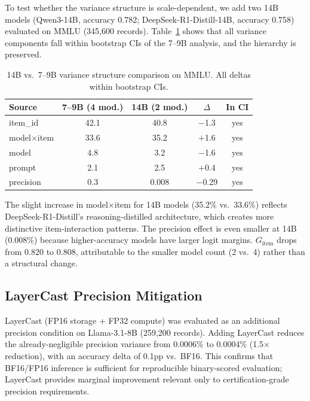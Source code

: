 \documentclass[11pt,a4paper]{article}
\newcommand{\Gcoeff}{\ensuremath{G}}
\begin{document}
To test whether the variance structure is scale-dependent, we add two 14B models (Qwen3-14B, accuracy 0.782; DeepSeek-R1-Distill-14B, accuracy 0.758) evaluated on MMLU (345,600 records).
Table~\ref{tab:scale} shows that all variance components fall within bootstrap CIs of the 7--9B analysis, and the hierarchy is preserved.

\begin{table}[t]
\centering
\caption{14B vs.\ 7--9B variance structure comparison on MMLU. All deltas within bootstrap CIs.}
\label{tab:scale}
\small
\begin{tabular}{lcccc}
\toprule
\textbf{Source} & \textbf{7--9B (4 mod.)} & \textbf{14B (2 mod.)} & \textbf{$\Delta$} & \textbf{In CI} \\
\midrule
item\_id        & 42.1 & 40.8 & $-$1.3 & yes \\
model$\times$item & 33.6 & 35.2 & $+$1.6 & yes \\
model           &  4.8 &  3.2 & $-$1.6 & yes \\
prompt          &  2.1 &  2.5 & $+$0.4 & yes \\
precision       &  0.3 & 0.008 & $-$0.29 & yes \\
\bottomrule
\end{tabular}
\end{table}

The slight increase in model$\times$item for 14B models (35.2\% vs.\ 33.6\%) reflects DeepSeek-R1-Distill's reasoning-distilled architecture, which creates more distinctive item-interaction patterns.
The precision effect is even smaller at 14B (0.008\%) because higher-accuracy models have larger logit margins.
$\Gcoeff_\text{item}$ drops from 0.820 to 0.808, attributable to the smaller model count (2 vs.\ 4) rather than a structural change.

\subsection{LayerCast Precision Mitigation}
\label{sec:layercast}

LayerCast (FP16 storage + FP32 compute) was evaluated as an additional precision condition on Llama-3.1-8B (259,200 records).
Adding LayerCast reduces the already-negligible precision variance from 0.0006\% to 0.0004\% (1.5$\times$ reduction), with an accuracy delta of 0.1pp vs.\ BF16.
This confirms that BF16/FP16 inference is sufficient for reproducible binary-scored evaluation; LayerCast provides marginal improvement relevant only to certification-grade precision requirements.
\end{document}
